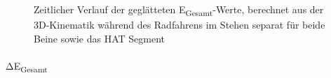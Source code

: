 \documentclass[
  letterpaper,
  DIV=11]{scrartcl}
\makeatletter
\let\oldparagraph\paragraph
\renewcommand{\paragraph}{
    \@ifstar
      \xxxParagraphStar
      \xxxParagraphNoStar
  }
\newcommand{\xxxParagraphStar}[1]{\oldparagraph*{#1}\mbox{}}
\newcommand{\xxxParagraphNoStar}[1]{\oldparagraph{#1}\mbox{}}
\makeatother
\begin{document}
\begin{figure}


\caption{\label{fig-PInt_Kinematik_HAT_E_gesamt_stehen}Zeitlicher
Verlauf der geglätteten E\textsubscript{Gesamt}-Werte, berechnet aus der
3D-Kinematik während des Radfahrens im Stehen separat für beide Beine
sowie das HAT Segment}

\end{figure}%

\paragraph{\texorpdfstring{ΔE\textsubscript{Gesamt}}{ΔEGesamt}}
\end{document}
